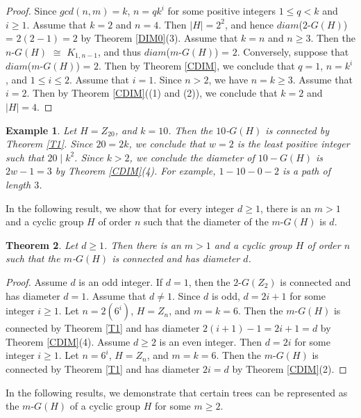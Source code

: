 \documentclass{amsart}
\newtheorem{thm}{Theorem}[section]
\theoremstyle{plain}
\newtheorem{exa}[thm]{Example}
\begin{document}
	\begin{proof}
		Since $gcd(n, m) = k$, $n = qk^i$ for some positive integers $1 \leq q < k$ and $i \geq 1$. Assume that $k = 2$ and $n = 4$. Then $|H| = 2^2$, and hence $diam$($2$-$G(H)$) = $2 (2-1) = 2$ by Theorem \ref{DIM0}(3). Assume that $k = n$ and $n \geq 3$. Then the $n$-$G(H)$ $\cong$ $K_{1, n-1}$, and thus  $diam$($m$-$G(H)$) = $2$. Conversely, suppose that $diam$($m$-$G(H)$) = $2$. Then by Theorem \ref{CDIM}, we conclude that $q = 1$, $n = k^i$, and $1 \leq i \leq 2$. Assume that $i = 1$. Since $n > 2$, we have $n = k \geq 3$.  Assume that $i = 2$. Then by Theorem \ref{CDIM}((1) and (2)), we conclude that $k = 2$ and $|H| = 4$.  
		\end{proof}
\begin{exa}\label{E4}
Let $H = Z_{20}$, and $k = 10$. Then the $10$-$G(H)$ is connected by Theorem \ref{T1}. Since $20 = 2k$, we conclude that $w = 2$ is the least positive integer such that $20 \mid k^2$. Since $k > 2$, we conclude the diameter of $10-G(H)$ is $2w - 1 = 3$ by Theorem \ref{CDIM}(4). For example, $1-10-0-2$ is a path of length $3$.  
\end{exa}

In the following result, we show that for every integer $d \geq 1$, there is an $m > 1$ and a cyclic group $H$ of order $n$ such that the diameter of the $m$-$G(H)$ is $d$. 

\begin{thm}\label{T4} Let $d \geq 1$. Then there is an $m > 1$ and a cyclic group $H$ of order $n$ such that the $m$-$G(H)$ is connected and has diameter $d$. 
		\end{thm}
\begin{proof} Assume $d$ is an odd integer. If $d = 1$, then the $2$-$G(Z_2)$ is connected and has  diameter $d = 1$. Assume that $d \not = 1$. Since $d$ is odd, $d = 2i + 1$ for some integer $i \geq 1$. Let $n = 2(6^{i})$, $H = Z_n$, and $m = k = 6$. Then the $m$-$G(H)$ is connected by Theorem \ref{T1} and has diameter $2(i + 1) - 1 = 2i + 1 = d$ by Theorem \ref{CDIM}(4). Assume $d \geq 2$ is an even integer. Then $d = 2i$ for some integer $i \geq 1$. Let $n = 6^{i}$, $H = Z_n$, and $m = k = 6$. Then the $m$-$G(H)$ is connected by Theorem \ref{T1} and has diameter $2i = d$ by Theorem \ref{CDIM}(2). 


\end{proof}

In the following results, we demonstrate that certain trees can be represented as the $m$-$G(H)$ of a cyclic group $H$ for some $m \geq 2$. 
\end{document}

